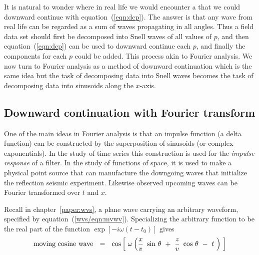 \par
It is natural to wonder where in real life
we would encounter a  that we could downward continue
with equation~(\ref{eqn:dcp}).
The answer is that any wave from real life
can be regarded as a sum of waves propagating in all angles.
Thus a field data set should first be decomposed
into Snell waves of all values of $p$,
and then equation~(\ref{eqn:dcp})
can be used to downward continue each $p$,
and finally the components for each $p$ could be added.
This process akin to Fourier analysis.
We now turn to Fourier analysis as a method of downward continuation
which is the same idea but
the task of decomposing data into Snell waves
becomes the task of decomposing data into sinusoids along the $x$-axis.

\subsection{Downward continuation with Fourier transform}

\par
One of the main ideas in Fourier analysis
is that an impulse function
(a delta function)
can be constructed by the superposition of sinusoids
(or complex exponentials).
In the study of time series this construction is used for the
{\em 
impulse response
}
of a filter.
In the study of functions of space,
it is used to make a physical point source
that can manufacture the downgoing waves
that initialize the reflection seismic experiment.
Likewise observed upcoming waves can be Fourier transformed over $t$ and $x$.

\par
Recall in chapter~\ref{paper:wvs}, a plane wave carrying
an arbitrary waveform, specified by
equation~(\ref{wvs/eqn:mvwv}).
Specializing the arbitrary function to be
the real part of the function  $ \exp [ - i \omega (t-t_0 ) ]$  gives
\begin{equation}
\hbox{moving cosine wave} \ \ =\ \  \cos
\left[ \  \omega \left(  {x \over v }\  \sin \, \theta \ +\ 
{z \over v }\  \cos \, \theta \ -\  t \   \right) \   \right]
\label{eqn:2iei5}
\end{equation}

